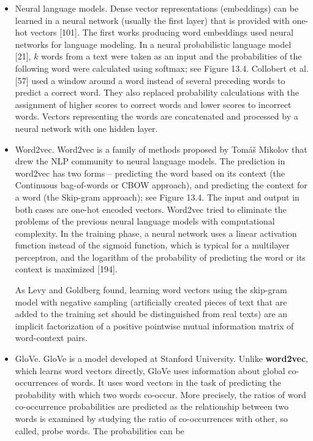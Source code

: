 \documentclass[11pt,openany,executivepaper]{book}
\begin{document}
\begin{itemize}
    \item Neural language models. Dense vector representations (embeddings) can be learned in a neural network (usually the first layer) that is provided with one-hot vectors [101]. The first works producing word embeddings used neural networks for language modeling. In a neural probabilistic language model [21], $k$ words from a text were taken as an input and the probabilities of the following word were calculated using softmax; see Figure 13.4. Collobert et al. [57] used a window around a word instead of several preceding words to predict a correct word. They also replaced probability calculations with the assignment of higher scores to correct words and lower scores to incorrect words. Vectors representing the words are concatenated and processed by a neural network with one hidden layer.

    \item Word2vec. Word2vec is a family of methods proposed by Tomáš Mikolov that drew the NLP community to neural language models. The prediction in word2vec has two forms -- predicting the word based on its context (the Continuous bag-of-words or CBOW approach), and predicting the context for a word (the Skip-gram approach); see Figure 13.4. The input and output in both cases are one-hot encoded vectors. Word2vec tried to eliminate the problems of the previous neural language models with computational complexity. In the training phase, a neural network uses a linear activation function instead of the sigmoid function, which is typical for a multilayer perceptron, and the logarithm of the probability of predicting the word or its context is maximized [194].

    As Levy and Goldberg \cite{165} found, learning word vectors using the skip-gram model with negative sampling (artificially created pieces of text that are added to the training set should be distinguished from real texts) are an implicit factorization of a positive pointwise mutual information matrix of word-context pairs.

    \item GloVe. GloVe is a model developed at Stanford University. Unlike \textbf{word\-2vec}, which learns word vectors directly, GloVe uses information about global co-occurrences of words. It uses word vectors in the task of predicting the probability with which two words co-occur. More precisely, the ratios of word co-occurrence probabilities are predicted as the relationship between two words is examined by studying the ratio of co-occurrences with other, so called, probe words. The probabilities can be
\end{itemize}
\end{document}
